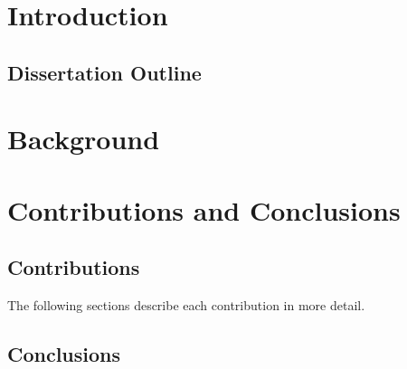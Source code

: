 \chapter{Introduction}

\section{Dissertation Outline}
\chapter{Background}
\chapter{Contributions and Conclusions}
\section{Contributions}
The following sections describe each contribution in more detail.

\subsection{\paperItitle}

\section{Conclusions}
\label{sec:kappa-conclusions}
{ \raggedright
\printbibliography[segment=\therefsegment,heading=bibintoc]
}
